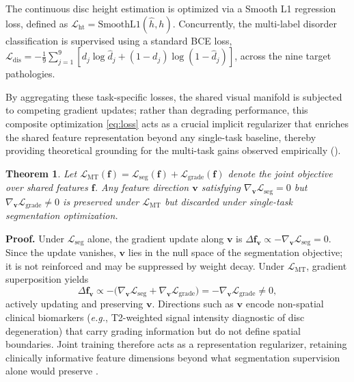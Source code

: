 \documentclass[journal]{IEEEtran}
\makeatletter
\newtheorem{theorem}{Theorem}[section]
\newcommand{\eg}{\textit{e.g.}\@\xspace}
\makeatother
\begin{document}
The continuous disc height estimation is optimized via a Smooth L1 regression loss, defined as $\mathcal{L}_\text{ht} = \text{SmoothL1}(\hat{h}, h)$. Concurrently, the multi-label disorder classification is supervised using a standard BCE loss, $\mathcal{L}_\text{dis} = -\frac{1}{9}\sum_{j=1}^{9}[d_j \log \hat{d}_j + (1{-}d_j)\log(1{-}\hat{d}_j)]$, across the nine target pathologies.


By aggregating these task-specific losses, the shared visual manifold is subjected to competing gradient updates; rather than degrading performance, this composite optimization \eqref{eq:loss} acts as a crucial implicit regularizer that enriches the shared feature representation beyond any single-task baseline, thereby providing theoretical grounding for the multi-task gains observed empirically ().

\begin{theorem}
\label{thm:multitask}
Let $\mathcal{L}_{\mathrm{MT}}(\mathbf{f}) = \mathcal{L}_{\mathrm{seg}}(\mathbf{f}) + \mathcal{L}_{\mathrm{grade}}(\mathbf{f})$ denote the joint objective over shared features $\mathbf{f}$. Any feature direction $\mathbf{v}$ satisfying $\nabla_{\mathbf{v}}\mathcal{L}_{\mathrm{seg}} = 0$ but $\nabla_{\mathbf{v}}\mathcal{L}_{\mathrm{grade}} \neq 0$ is preserved under $\mathcal{L}_{\mathrm{MT}}$ but discarded under single-task segmentation optimization.
\end{theorem}

\textbf{Proof.}
Under $\mathcal{L}_{\mathrm{seg}}$ alone, the gradient update along $\mathbf{v}$ is $\Delta\mathbf{f}_{\mathbf{v}} \propto -\nabla_{\mathbf{v}}\mathcal{L}_{\mathrm{seg}} = 0$. Since the update vanishes, $\mathbf{v}$ lies in the null space of the segmentation objective; it is not reinforced and may be suppressed by weight decay. Under $\mathcal{L}_{\mathrm{MT}}$, gradient superposition yields
\[
\Delta\mathbf{f}_{\mathbf{v}} \propto -\bigl(\nabla_{\mathbf{v}}\mathcal{L}_{\mathrm{seg}} + \nabla_{\mathbf{v}}\mathcal{L}_{\mathrm{grade}}\bigr) = -\nabla_{\mathbf{v}}\mathcal{L}_{\mathrm{grade}} \neq 0,
\]
actively updating and preserving $\mathbf{v}$. Directions such as $\mathbf{v}$ encode non-spatial clinical biomarkers (\eg, T2-weighted signal intensity diagnostic of disc degeneration) that carry grading information but do not define spatial boundaries. Joint training therefore acts as a representation regularizer, retaining clinically informative feature dimensions beyond what segmentation supervision alone would preserve \cite{caruana1997multitask}.
\end{document}
